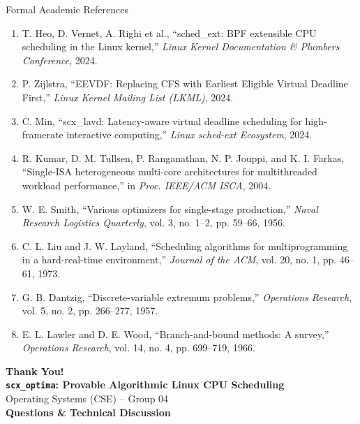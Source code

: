 \documentclass{beamer}
\begin{document}
\begin{frame}[allowframebreaks]{Formal Academic References}
  \scriptsize
  \begin{enumerate}
    \item T. Heo, D. Vernet, A. Righi et al., ``sched\_ext: BPF extensible CPU scheduling in the Linux kernel,'' \textit{Linux Kernel Documentation \& Plumbers Conference}, 2024.
    \item P. Zijlstra, ``EEVDF: Replacing CFS with Earliest Eligible Virtual Deadline First,'' \textit{Linux Kernel Mailing List (LKML)}, 2024.
    \item C. Min, ``scx\_lavd: Latency-aware virtual deadline scheduling for high-framerate interactive computing,'' \textit{Linux sched-ext Ecosystem}, 2024.
    \item R. Kumar, D. M. Tullsen, P. Ranganathan, N. P. Jouppi, and K. I. Farkas, ``Single-ISA heterogeneous multi-core architectures for multithreaded workload performance,'' in \textit{Proc. IEEE/ACM ISCA}, 2004.
    \item W. E. Smith, ``Various optimizers for single-stage production,'' \textit{Naval Research Logistics Quarterly}, vol. 3, no. 1--2, pp. 59--66, 1956.
    \item C. L. Liu and J. W. Layland, ``Scheduling algorithms for multiprogramming in a hard-real-time environment,'' \textit{Journal of the ACM}, vol. 20, no. 1, pp. 46--61, 1973.
    \item G. B. Dantzig, ``Discrete-variable extremum problems,'' \textit{Operations Research}, vol. 5, no. 2, pp. 266--277, 1957.
    \item E. L. Lawler and D. E. Wood, ``Branch-and-bound methods: A survey,'' \textit{Operations Research}, vol. 14, no. 4, pp. 699--719, 1966.
  \end{enumerate}
\end{frame}

{
\begin{frame}[plain]
\begin{center}
\vspace{1.0cm}
{\Huge \textbf{\color{PrimaryBlue} Thank You!}}\\[0.35cm]
{\Large \textbf{\texttt{scx\_optima}: Provable Algorithmic Linux CPU Scheduling}}\\[0.25cm]
{\normalsize Operating Systems (CSE) -- Group 04}\\[0.5cm]
\textbf{Questions \& Technical Discussion}
\end{center}
\end{frame}
}
\end{document}

